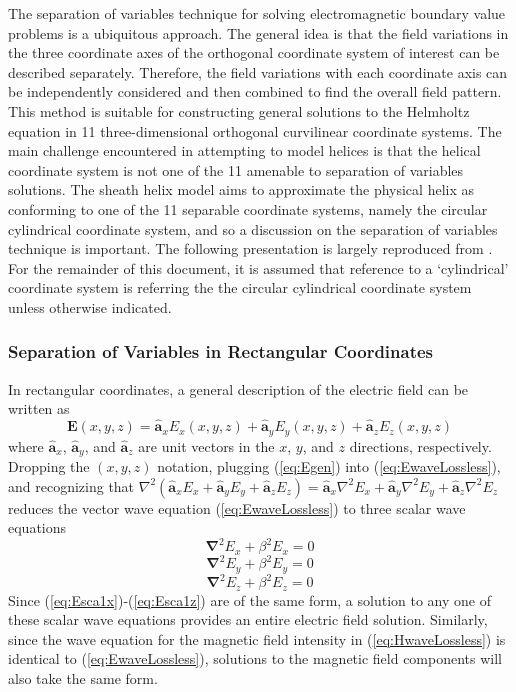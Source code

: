 The separation of variables technique for solving electromagnetic boundary value problems is a ubiquitous approach. The general idea is that the field variations in the three coordinate axes of the orthogonal coordinate system of interest can be described separately. Therefore, the field variations with each coordinate axis can be independently considered and then combined to find the overall field pattern. This method is suitable for constructing general solutions to the Helmholtz equation in 11 three-dimensional orthogonal curvilinear coordinate systems. The main challenge encountered in attempting to model helices is that the helical coordinate system is not one of the 11 amenable to separation of variables solutions. The sheath helix model aims to approximate the physical helix as conforming to one of the 11 separable coordinate systems, namely the circular cylindrical coordinate system, and so a discussion on the separation of variables technique is important. The following presentation is largely reproduced from \cite{balanis1}. For the remainder of this document, it is assumed that reference to a `cylindrical' coordinate system is referring the the circular cylindrical coordinate system unless otherwise indicated.

\subsubsection{Separation of Variables in Rectangular Coordinates}\label{subsubsec:seperation_rectangular}
In rectangular coordinates, a general description of the electric field can be written as
\begin{equation}\label{eq:Egen}
	\mathbf{E}(x,y,z) =  \hat{\mathbf{a}}_{x}E_x(x,y,z) + \hat{\mathbf{a}}_{y}E_y(x,y,z) +\hat{\mathbf{a}}_{z}E_z(x,y,z)
\end{equation}
where $\hat{\mathbf{a}}_x$, $\hat{\mathbf{a}}_y$, and $\hat{\mathbf{a}}_z$ are unit vectors in the $x$, $y$, and $z$ directions, respectively. Dropping the $(x,y,z)$ notation, plugging (\ref{eq:Egen}) into (\ref{eq:EwaveLossless}), and recognizing that $\nabla^2(\hat{\mathbf{a}}_{x}E_x + \hat{\mathbf{a}}_{y}E_y +\hat{\mathbf{a}}_{z}E_z) = \hat{\mathbf{a}}_{x}\nabla^2E_x + \hat{\mathbf{a}}_{y}\nabla^2E_y +\hat{\mathbf{a}}_{z}\nabla^2E_z$ reduces the vector wave equation (\ref{eq:EwaveLossless}) to three scalar wave equations
\begin{equation}\label{eq:Esca1x}
	\mathbf{\nabla}^2 {E_x} + \beta^2 E_x = 0
\end{equation}
\begin{equation}\label{eq:Esca1y}
	\mathbf{\nabla}^2 {E_y} + \beta^2 E_y = 0
\end{equation}
\begin{equation}\label{eq:Esca1z}
	\mathbf{\nabla}^2 {E_z} + \beta^2 E_z = 0
\end{equation}
Since (\ref{eq:Esca1x})-(\ref{eq:Esca1z}) are of the same form, a solution to any one of these scalar wave equations provides an entire electric field solution. Similarly, since the wave equation for the magnetic field intensity in (\ref{eq:HwaveLossless}) is identical to (\ref{eq:EwaveLossless}), solutions to the magnetic field components will also take the same form.

